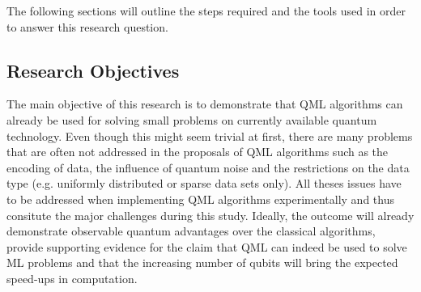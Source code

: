 \documentclass[a4paper]{article}
\newcommand*{\0}{$\ket{0}$}
\newcommand*{\1}{$\ket{1}$}
\begin{document}

\flushleft
The following sections will outline the steps required and the tools used in order to answer this research question. 

\newpage
\subsection{Research Objectives}
\label{subsec:researchobjectives}

The main objective of this research is to demonstrate that QML algorithms can already be used for solving small problems on currently available quantum technology. Even though this might seem trivial at first, there are many problems that are often not addressed in the proposals of QML algorithms such as the encoding of data, the influence of quantum noise and the restrictions on the data type (e.g. uniformly distributed or sparse data sets only). All theses issues have to be addressed when implementing QML algorithms experimentally and thus consitute the major challenges during this study. 
Ideally, the outcome will already demonstrate observable quantum advantages over the classical algorithms, provide supporting evidence for the claim that QML can indeed be used to solve ML problems and that the increasing number of qubits will bring the expected speed-ups in computation.


\end{document}
